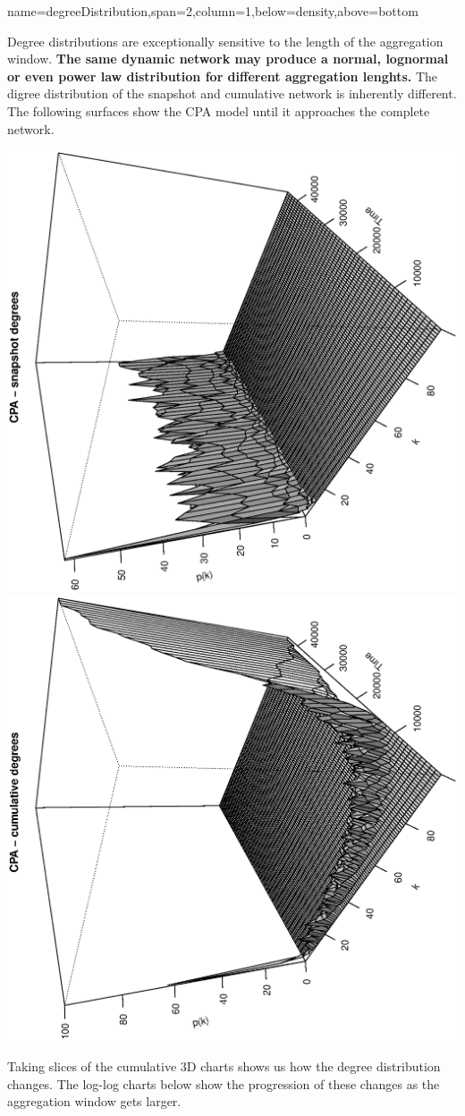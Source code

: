 \documentclass[a0paper,portrait]{baposter}
\begin{document}
\begin{poster}
{name=degreeDistribution,span=2,column=1,below=density,above=bottom}{
Degree distributions are exceptionally sensitive to the length of the aggregation window. \textbf{The same dynamic network may produce a normal, lognormal or even power law distribution for different aggregation lenghts.} The digree distribution of the snapshot and cumulative network is inherently different. The following surfaces show the CPA model until it approaches the complete network.
\vspace{-0.2em}
\begin{center}
  \includegraphics[angle=-90,width=0.49\linewidth]{CPA_3d_snapshot}
  \includegraphics[angle=-90,width=0.49\linewidth]{CPA_3d_cumulative}
\end{center}
\vspace{-0.2em}
Taking slices of the cumulative 3D charts shows us how the degree distribution changes. The log-log charts below show the progression of these changes as the aggregation window gets larger.
\vspace{-0.2em}
\begin{center}

\end{center}}
\end{poster}
\end{document}
